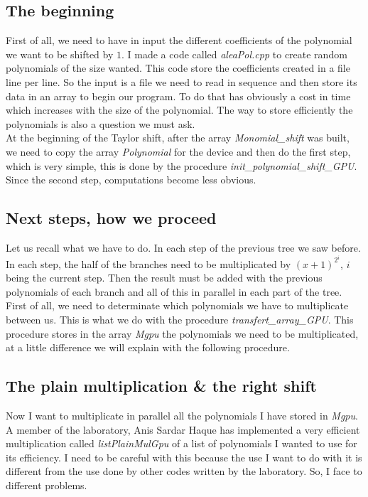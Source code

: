 \subsection{The beginning}
First of all, we need to have in input the different coefficients of the polynomial we want to be shifted by $1$. I made a code called \textit{aleaPol.cpp} to create random polynomials of the size wanted. This code store the coefficients created in a file line per line. So the input is a file we need to read in sequence and then store its data in an array to begin our program. To do that has obviously a cost in time which increases with the size of the polynomial. The way to store efficiently the polynomials is also a question we must ask.\\

At the beginning of the Taylor shift, after the array \textit{Monomial\_shift} was built, we need to copy the array \textit{Polynomial} for the device and then do the first step, which is very simple, this is done by the procedure \textit{init\_polynomial\_shift\_GPU}.\\

Since the second step, computations become less obvious.

\subsection{Next steps, how we proceed}
Let us recall what we have to do. In each step of the previous tree we saw before. In each step, the half of the branches need to be multiplicated by $(x+1)^{2^i}$, $i$ being the current step. Then the result must be added with the previous polynomials of each branch and all of this in parallel in each part of the tree. First of all, we need to determinate which polynomials we have to multiplicate between us. This is what we do with the procedure \textit{transfert\_array\_GPU}. This procedure stores in the array \textit{Mgpu} the polynomials we need to be multiplicated, at a little difference we will explain with the following procedure.\\

\subsection{The plain multiplication \& the right shift}
Now I want to multiplicate in parallel all the polynomials I have stored in \textit{Mgpu}. A member of the laboratory, Anis Sardar Haque has implemented a very efficient multiplication called \textit{listPlainMulGpu} of a list of polynomials I wanted to use for its efficiency. I need to be careful with this because the use I want to do with it is different from the use done by other codes written by the laboratory. So, I face to different problems.\\

